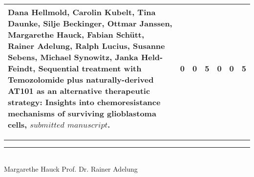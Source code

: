 \begin{xltabular}{\textwidth}{| X | c | c | c | c | c | c |}
Dana Hellmold, Carolin Kubelt, Tina Daunke, Silje Beckinger, Ottmar Janssen, \textbf{Margarethe Hauck}, Fabian Schütt, Rainer Adelung, Ralph Lucius, Susanne Sebens, Michael Synowitz, Janka Held-Feindt, Sequential treatment with Temozolomide plus naturally-derived AT101 as an alternative therapeutic strategy: Insights into chemoresistance mechanisms of surviving glioblastoma cells, $submitted$ $manuscript$. &0&0&5&0&0&5 \tabularnewline \hline    

\end{xltabular} 
\vspace{4cm}
\rule{5cm}{0.2pt} \hspace{4cm} \rule{5cm}{0.2pt}\\ 
\hspace*{1cm} Margarethe Hauck \hspace{5.2cm} Prof. Dr. Rainer Adelung

